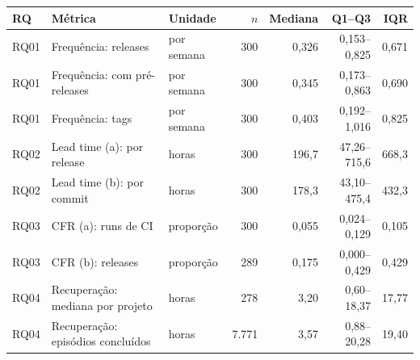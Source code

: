 \begin{tabular}{lllrrrr}
\hline
RQ & Métrica & Unidade & $n$ & Mediana & Q1--Q3 & IQR \\
\hline
RQ01 & Frequência: releases & por semana & 300 & 0,326 & 0,153--0,825 & 0,671 \\
RQ01 & Frequência: com pré-releases & por semana & 300 & 0,345 & 0,173--0,863 & 0,690 \\
RQ01 & Frequência: tags & por semana & 300 & 0,403 & 0,192--1,016 & 0,825 \\
\hline
RQ02 & Lead time (a): por release & horas & 300 & 196,7 & 47,26--715,6 & 668,3 \\
RQ02 & Lead time (b): por commit & horas & 300 & 178,3 & 43,10--475,4 & 432,3 \\
\hline
RQ03 & CFR (a): runs de CI & proporção & 300 & 0,055 & 0,024--0,129 & 0,105 \\
RQ03 & CFR (b): releases & proporção & 289 & 0,175 & 0,000--0,429 & 0,429 \\
\hline
RQ04 & Recuperação: mediana por projeto & horas & 278 & 3,20 & 0,60--18,37 & 17,77 \\
RQ04 & Recuperação: episódios concluídos & horas & 7.771 & 3,57 & 0,88--20,28 & 19,40 \\
\hline
\end{tabular}
